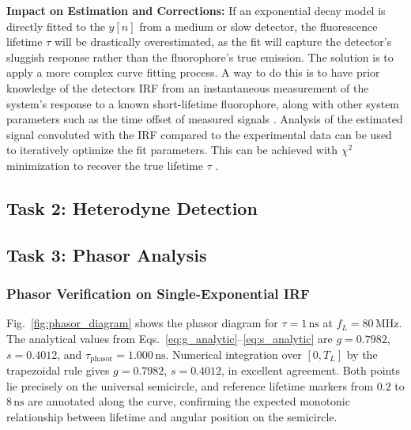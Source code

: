 \documentclass[conference]{IEEEtran}
\begin{document}
\textbf{Impact on Estimation and Corrections:} 
If an exponential decay model is directly fitted to the $y[n]$ from a medium or slow detector, the fluorescence lifetime $\tau$ will be drastically overestimated,
as the fit will capture the detector's sluggish response rather than the fluorophore's true emission. 
The solution is to apply a more complex curve fitting process. 
A way to do this is to have prior knowledge of the detectors IRF from an instantaneous measurement of the system's response to a known short-lifetime fluorophore,
along with other system parameters such as the time offset of measured signals \cite{Datta2020}. 
Analysis of the estimated signal convoluted with the IRF compared to the experimental data can be used to iteratively optimize the fit parameters.
This can be achieved with $\chi^2$ minimization to recover the true lifetime $\tau$ \cite{Datta2020}.


\subsection{Task 2: Heterodyne Detection}


\subsection{Task 3: Phasor Analysis}

\subsubsection{Phasor Verification on Single-Exponential IRF}
Fig.~\ref{fig:phasor_diagram} shows the phasor diagram for
$\tau = 1\,\text{ns}$ at $f_L = 80\,\text{MHz}$.
The analytical values from Eqs.~\eqref{eq:g_analytic}--\eqref{eq:s_analytic}
are $g = 0.7982$, $s = 0.4012$, and $\tau_\text{phasor} = 1.000\,\text{ns}$.
Numerical integration over $[0,T_L]$ by the trapezoidal rule gives
$g = 0.7982$, $s = 0.4012$, in excellent agreement.
Both points lie precisely on the universal semicircle, and reference
lifetime markers from $0.2$ to $8\,\text{ns}$ are annotated along the
curve, confirming the expected monotonic relationship between lifetime
and angular position on the semicircle.
\end{document}
